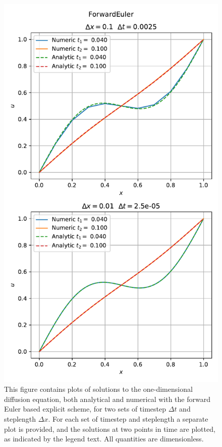 \documentclass[reprint,english,notitlepage]{revtex4-1}  %
\begin{document}
\begin{figure}[H]
\centering
\includegraphics[width=\columnwidth]{../data/ForwardEuler.pdf}
\caption{This figure contains plots of solutions to the one-dimensional diffusion equation, both analytical and numerical with the forward Euler based explicit scheme, for two sets of timestep $\Delta t$ and steplength $\Delta x$. For each set of timestep and steplength a separate plot is provided, and the solutions at two points in time are plotted, as indicated by the legend text. All quantities are dimensionless.} \label{fig:forward_euler_solution}
\end{figure}
\end{document}
